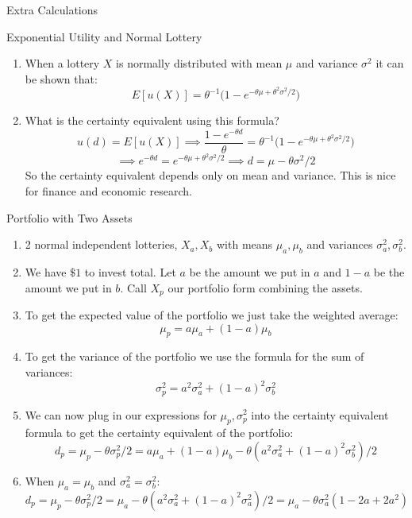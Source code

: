 \documentclass[aspectratio=169]{beamer}
\begin{document}
\begin{frame}{}
    
\vspace{2cm}
\centering
\Large Extra Calculations

\end{frame}

\begin{frame}{Exponential Utility and Normal Lottery}
   \begin{enumerate}
        \item   When a lottery $X$ is normally distributed with mean $\mu$ and variance $\sigma^2$ it can be shown that:
    \[E[u(X)]=\theta^{-1} \bigg ( 1-e^{-\theta\mu+\theta^2 \sigma^2/2} \bigg )\]
    
       \item What is the certainty equivalent using this formula?
       \[u(d)=E[u(X)] \implies \frac{1-e^{-\theta d}}{\theta} = \theta^{-1} \bigg ( 1-e^{-\theta\mu+\theta^2 \sigma^2/2} \bigg )\]
       \[\implies e^{-\theta d} = e^{-\theta\mu+\theta^2 \sigma^2/2} \implies d = \mu - \theta \sigma^2/2\]
       So the certainty equivalent depends only on mean and variance. This is nice for finance and economic research.
       
    
   \end{enumerate}

    
\end{frame}

\begin{frame}{Portfolio with Two Assets}
     
    
    \begin{enumerate}
        \item 2 normal independent lotteries, $X_a, X_b$ with means $\mu_a, \mu_b$ and variances $\sigma^2_a, \sigma^2_b$.
        \item We have $\$1$ to invest total. Let $a$ be the amount we put in $a$ and $1-a$ be the amount we put in $b$. Call $X_p$ our portfolio form combining the assets.
        \item To get the expected value of the portfolio we just take the weighted average:
        \[\mu_p = a \mu_a + (1-a)\mu_b\]
        \item To get the variance of the portfolio we use the formula for the sum of variances:
        \[\sigma^2_p = a^2 \sigma^2_a + (1-a)^2\sigma^2_b\]
        \item We can now plug in our expressions for $\mu_p, \sigma^2_p$ into the certainty equivalent formula to get the certainty equivalent of the portfolio:
        \[d_p = \mu_p - \theta \sigma^2_p/2 = a \mu_a + (1-a)\mu_b -\theta (a^2 \sigma^2_a + (1-a)^2\sigma^2_b)/2\]
        \item When $\mu_a=\mu_b$ and $\sigma^2_a=\sigma^2_b$:
        \[d_p = \mu_p - \theta \sigma^2_p/2 = \mu_a -\theta (a^2 \sigma^2_a + (1-a)^2\sigma^2_a)/2=\mu_a -\theta \sigma^2_a(1-2a+2a^2)\]
    \end{enumerate}
    

    
\end{frame}
\end{document}
